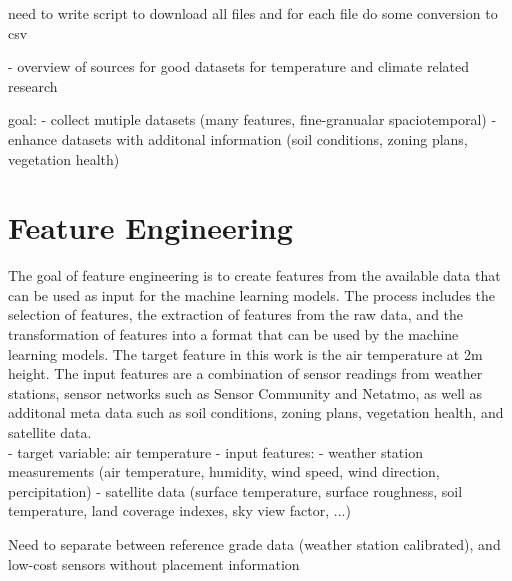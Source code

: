 need to write script to download all files and for each file do some conversion to csv

- overview of sources for good datasets for temperature and climate related research

goal:
- collect mutiple datasets (many features, fine-granualar spaciotemporal)
- enhance datasets with additonal information (soil conditions, zoning plans, vegetation health)


\section{Feature Engineering}

The goal of feature engineering is to create features from the available data that can be used as input for the machine learning models. The process includes the selection of features, the extraction of features from the raw data, and the transformation of features into a format that can be used by the machine learning models.
The target feature in this work is the air temperature at 2m height. The input features are a combination of sensor readings from weather stations, sensor networks such as Sensor Community and Netatmo, as well as additonal meta data such as soil conditions, zoning plans, vegetation health, and satellite data.\\

- target variable: air temperature
- input features:
    - weather station measurements (air temperature, humidity, wind speed, wind direction, percipitation)
    - satellite data (surface temperature, surface roughness, soil temperature, land coverage indexes, sky view factor, ...)

    Need to separate between reference grade data (weather station calibrated), and low-cost sensors without placement information




